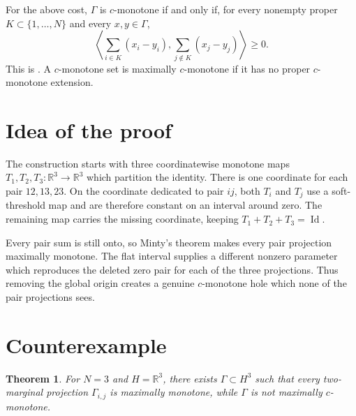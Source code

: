 \documentclass[11pt]{article}
\newtheorem{theorem}{Theorem}
\newcommand{\R}{\mathbb{R}}
\newcommand{\Id}{\operatorname{Id}}
\newcommand{\ip}[2]{\left\langle #1,#2\right\rangle}
\begin{document}
For the above cost, \(\Gamma\) is \(c\)-monotone if and only if, for every
nonempty proper \(K\subset\{1,\ldots,N\}\) and every \(x,y\in\Gamma\),
\[
 \ip{\sum_{i\in K}(x_i-y_i)}{\sum_{j\notin K}(x_j-y_j)}\ge0.
\]
This is \cite[Lemma~2.3]{BBPW}.  A \(c\)-monotone set is maximally
\(c\)-monotone if it has no proper \(c\)-monotone extension.

\section{Idea of the proof}

The construction starts with three coordinatewise monotone maps
\(T_1,T_2,T_3\colon\R^3\to\R^3\) which partition the identity.  There is one
coordinate for each pair \(12,13,23\).  On the coordinate dedicated to pair
\(ij\), both \(T_i\) and \(T_j\) use a soft-threshold map and are therefore
constant on an interval around zero.  The remaining map carries the missing
coordinate, keeping \(T_1+T_2+T_3=\Id\).

Every pair sum is still onto, so Minty's theorem makes every pair projection
maximally monotone.  The flat interval supplies a different nonzero parameter
which reproduces the deleted zero pair for each of the three projections.
Thus removing the global origin creates a genuine \(c\)-monotone hole which
none of the pair projections sees.

\section{Counterexample}

\begin{theorem}
For \(N=3\) and \(H=\R^3\), there exists
\(\Gamma\subset H^3\) such that every two-marginal projection
\(\Gamma_{i,j}\) is maximally monotone, while \(\Gamma\) is not maximally
\(c\)-monotone.
\end{theorem}
\end{document}
